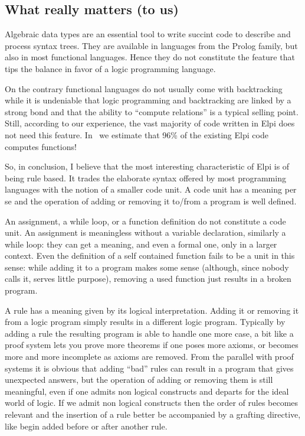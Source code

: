 \documentclass[a4paper, 11pt]{book}
\begin{document}
\subsection{What really matters (to us)}

Algebraic data types are an essential tool to write succint code
to describe and process syntax trees. They are available in languages
from the Prolog family, but also in most functional languages. Hence they do
not constitute the feature that tips the balance in favor of a logic
programming language.

On the contrary functional languages do not usually come with backtracking
while it is undeniable that logic programming and backtracking are linked by
a strong bond and that the ability to ``compute relations'' is a typical
selling point. Still, according to our experience, the vast majority of code
written in Elpi does not need this feature. In~\cite{elpidet} we
estimate that 96\% of the existing Elpi code computes functions!

So, in conclusion, I believe that the most interesting
characteristic of Elpi is of being rule based.
It trades the elaborate syntax offered by most
programming languages with the notion of a smaller code unit.
A code unit has a meaning per se and the operation of adding or removing it
to/from a program is well defined.

An assignment, a while loop, or a function definition do not
constitute a code unit. An assignment is meaningless without a variable
declaration, similarly a while loop: they can get a meaning, and even a formal 
one, only in a larger context. Even the definition of a self contained function fails
to be a unit in this sense: while adding it to a program makes some sense (although,
since nobody calls it, serves little purpose),
removing a used function just results in a broken program.

A rule has a meaning given by its logical interpretation. Adding it or removing
it from a logic program simply results in a different logic program. Typically
by adding a rule the resulting program is able to handle one more case,
a bit like a proof system lets you prove more theorems if one poses
more axioms, or becomes more and more incomplete as axioms are removed.
From the parallel with proof systems it is obvious that adding ``bad'' rules
can result in a program that gives unexpected answers, but the operation
of adding or removing them is still meaningful, even if one admits non logical
constructs and departs for the ideal world of logic.
If we admit non logical
constructs then the order of rules becomes relevant and the insertion of a
rule better be accompanied by a grafting directive, like begin added before
or after another rule.
\end{document}
